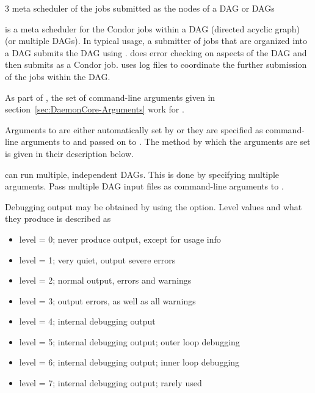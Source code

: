 \begin{ManPage}{\label{man-condor-dagman}}{3}
{meta scheduler of the jobs submitted as the nodes of a DAG or DAGs}
\Synopsis {}


\Description
{} is a meta scheduler for the Condor jobs within
a DAG (directed acyclic graph) (or multiple DAGs).
In typical usage,
a submitter of jobs that are organized into a DAG submits the
DAG using .
 does error checking on aspects of the DAG
and then submits  as a Condor job.
 uses log files to coordinate the further 
submission of the jobs within the DAG.

As part of , the set of command-line arguments
given in
section~\ref{sec:DaemonCore-Arguments}
work for .

Arguments to  are either automatically set
by  
or they are specified as command-line arguments to 
and passed on to .
The method by which the arguments are set is
given in their description below.

 can run multiple, independent DAGs.  This is done
by specifying multiple  arguments.
Pass multiple
DAG input files as command-line arguments to .

Debugging output may be obtained by using the
 option.
Level values and what they produce is described as
\begin{itemize}
  \item level = 0; never produce output, 
        except for usage info 
  \item level = 1; very quiet, output severe errors 
  \item level = 2; normal output, errors and warnings
  \item level = 3; output errors, as well as all warnings
  \item level = 4; internal debugging output
  \item level = 5; internal debugging output; outer loop debugging
  \item level = 6; internal debugging output; inner loop debugging
  \item level = 7; internal debugging output; rarely used
\end{itemize}



\end{ManPage}
